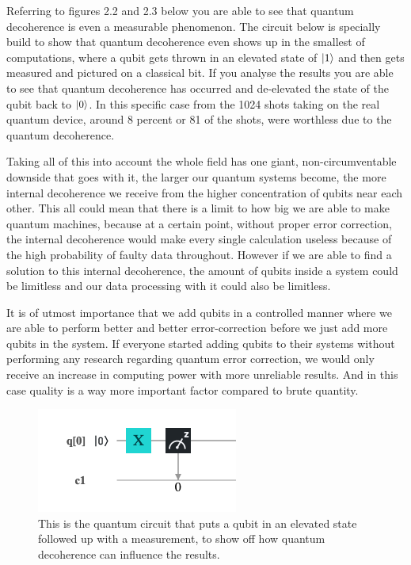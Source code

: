 Referring to figures 2.2 and 2.3 below you are able to see that quantum decoherence is even a measurable phenomenon. The circuit below is specially build to show that quantum decoherence even shows up in the smallest of computations, where a qubit gets thrown in an elevated state of $\ket{1}$ and then gets measured and pictured on a classical bit. If you analyse the results you are able to see that quantum decoherence has occurred and de-elevated the state of the qubit back to $\ket{0}$. In this specific case from the 1024 shots taking on the real quantum device, around 8 percent or 81 of the shots, were worthless due to the quantum decoherence.  

Taking all of this into account the whole field has one giant, non-circumventable downside that goes with it, the larger our quantum systems become, the more internal decoherence we receive from the higher concentration of qubits near each other. This all could mean that there is a limit to how big we are able to make quantum machines, because at a certain point, without proper error correction, the internal decoherence would make every single calculation useless because of the high probability of faulty data throughout. However if we are able to find a solution to this internal decoherence, the amount of qubits inside a system could be limitless and our data processing with it could also be limitless. \autocite{Hartnett2019}

It is of utmost importance that we add qubits in a controlled manner where we are able to perform better and better error-correction before we just add more qubits in the system. If everyone started adding qubits to their systems without performing any research regarding quantum error correction, we would only receive an increase in computing power with more unreliable results. And in this case quality is a way more important factor compared to brute quantity. 

\begin{figure}[h]
	\centering
	\includegraphics[scale = 0.75]{../Demonstration/img/Quantum_decoherence_circuit.PNG}
	\caption{This is the quantum circuit that puts a qubit in an elevated state followed up with a measurement, to show off how quantum decoherence can influence the results.}
\end{figure}


